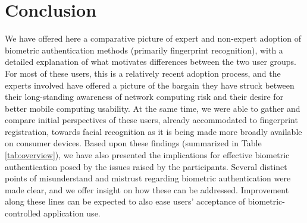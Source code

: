 \section{Conclusion}

We have offered here a comparative picture of expert and non-expert adoption of
biometric authentication methods (primarily fingerprint recognition), with a
detailed explanation of what motivates differences between the two user
groups. For most of these users, this is a relatively recent adoption process,
and the experts involved have offered a picture of the bargain they have struck
between their long-standing awareness of network computing risk and their desire
for better mobile computing usability. At the same time, we were able to gather
and compare initial perspectives of these users, already accommodated to
fingerprint registration, towards facial recognition as it is being made more
broadly available on consumer devices. Based upon these findings (summarized in
Table \ref{tab:overview}), we have also presented the implications for effective
biometric authentication posed by the issues raised by the participants. Several
distinct points of misunderstand and mistrust regarding biometric authentication
were made clear, and we offer insight on how these can be addressed. Improvement
along these lines can be expected to also ease users' acceptance of
biometric-controlled application use.

